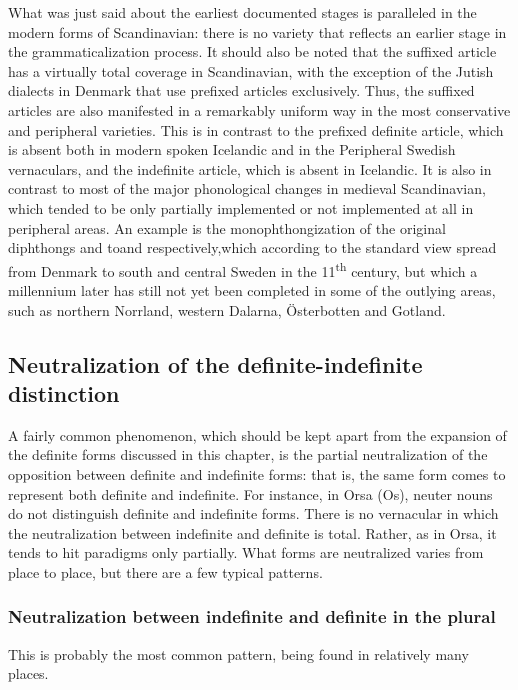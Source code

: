 What was just said about the earliest documented stages is paralleled in the modern forms of Scandinavian: there is no variety that reflects an earlier stage in the grammaticalization process. It should also be noted that the suffixed article has a virtually total coverage in Scandinavian, with the exception of the Jutish dialects in Denmark that use prefixed articles exclusively. Thus, the suffixed articles are also manifested in a remarkably uniform way in the most conservative and peripheral varieties. This is in contrast to the prefixed definite article, which is absent both in modern spoken Icelandic and in the Peripheral Swedish vernaculars, and the indefinite article, which is absent in Icelandic. It is also in contrast to most of the major phonological changes in medieval Scandinavian, which tended to be only partially implemented or not implemented at all in peripheral areas. An example is the monophthongization of the original diphthongs  and toand respectively,\textstyleLinguisticExample{ }which according to the standard view spread from Denmark to south and central Sweden in the 11\textsuperscript{th} century, but which a millennium later has still not yet been completed in some of the outlying areas, such as northern Norrland, western Dalarna, Österbotten and Gotland.  

\subsection{ Neutralization of the definite-indefinite distinction}
\label{bkm:Ref114304507}

A fairly common phenomenon, which should be kept apart from the expansion of the definite forms discussed in this chapter, is the partial neutralization of the opposition between definite and indefinite forms: that is, the same form comes to represent both definite and indefinite. For instance, in Orsa (Os), neuter nouns do not distinguish definite and indefinite forms. There is no vernacular in which the neutralization between indefinite and definite is total. Rather, as in Orsa, it tends to hit paradigms only partially. What forms are neutralized varies from place to place, but there are a few typical patterns.

\subsubsection{Neutralization between indefinite and definite in the plural}
 This is probably the most common pattern, being found in relatively many places. 

